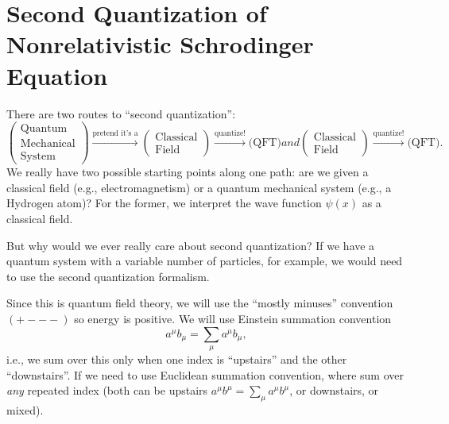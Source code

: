\section{Second Quantization of Nonrelativistic Schrodinger Equation}
\M
There are two routes to ``second quantization'':
\begin{subequations}
\begin{equation}
\begin{pmatrix}
\mbox{Quantum}\\
\mbox{Mechanical}\\
\mbox{System}
\end{pmatrix}
\xrightarrow{\text{pretend it's a}}
\begin{pmatrix}
\mbox{Classical}\\
\mbox{Field}
\end{pmatrix}
\xrightarrow{\text{quantize!}}
\mbox{(QFT)}
\end{equation}
and
\begin{equation}
\begin{pmatrix}
\mbox{Classical}\\
\mbox{Field}
\end{pmatrix}
\xrightarrow{\text{quantize!}}
\mbox{(QFT)}.
\end{equation}
\end{subequations}
We really have two possible starting points along one path: are we given
a classical field (e.g., electromagnetism) or a quantum mechanical
system (e.g., a Hydrogen atom)? For the former, we interpret the wave
function $\psi(x)$ as a classical field.

But why would we ever really care about second quantization? If we have
a quantum system with a variable number of particles, for example, we
would need to use the second quantization formalism.

Since this is quantum field theory, we will use the ``mostly
minuses''
convention $(+---)$ so energy is positive. We will use Einstein
summation convention
\begin{equation}
a^{\mu}b_{\mu}=\sum_{\mu}a^{\mu}b_{\mu},
\end{equation}
i.e., we sum over this only when one index is ``upstairs'' and the other
``downstairs''. If we need to use Euclidean summation convention, where
sum over \emph{any} repeated index (both can be upstairs
$a^{\mu}b^{\mu}=\sum_{\mu}a^{\mu}b^{\mu}$, or downstairs, or mixed).

